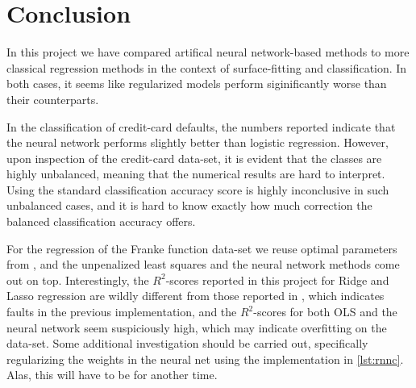\documentclass[a4paper, 11pt, oneside, article]{memoir}
\begin{document}
	\section{Conclusion}%
	\label{sec:conclusion}
	
	In this project we have compared artifical neural network-based methods
	to more classical regression methods in the context of surface-fitting
	and classification. In both cases, it seems like regularized models
	perform siginificantly worse than their counterparts. 
	
	In the classification of credit-card defaults, the numbers reported indicate
	that the neural network performs slightly better than logistic
	regression. However, upon inspection of the credit-card data-set, it is
	evident that the classes are highly unbalanced, meaning that the
	numerical results are hard to interpret. Using the standard
	classification accuracy score is highly inconclusive in such unbalanced
	cases, and it is hard to know exactly how much correction the balanced
	classification accuracy offers.
	
	For the regression of the Franke function data-set we reuse optimal
	parameters from \cite{stangebyFYSSTK4155Project2019}, and the
	unpenalized least squares and the neural network methods come out on
	top. Interestingly, the \( R^2 \)-scores reported in this project for
	Ridge and Lasso regression are wildly different from those reported in
	\cite{stangebyFYSSTK4155Project2019}, which indicates faults in the
	previous implementation, and the \( R^2 \)-scores for both OLS and the
	neural network seem suspiciously high, which may indicate overfitting
	on the data-set.  Some additional investigation should be carried out,
	specifically regularizing the weights in the neural net using the
	implementation in \cref{lst:rnnc}. Alas, this will have to be for
	another time.
	
\printbibliography
\end{document}
